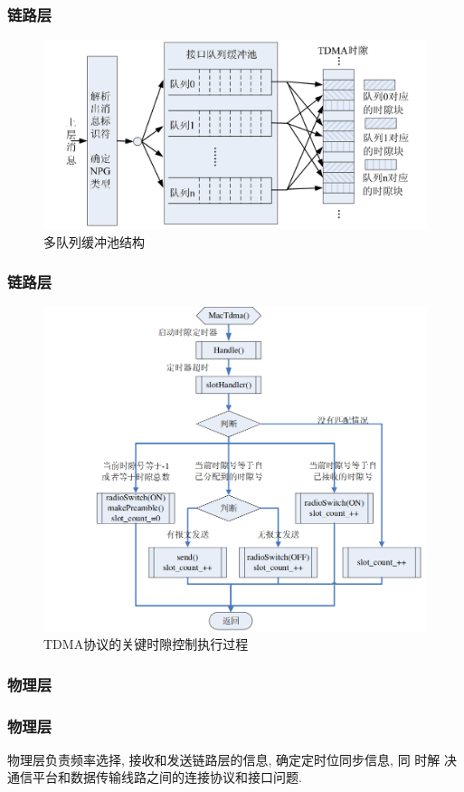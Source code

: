 \documentclass[10pt,mathserif]{beamer}%
\begin{document}
\begin{frame}[fragile]
	\frametitle{链路层}
	\setlength{\parindent}{2em}
	\begin{spacing}{1.5}
		\begin{figure}[htb]
			\centering
			\includegraphics[width=0.9\linewidth]{./images/fifo.png}
			\caption{多队列缓冲池结构}
			\label{Fig:fifo}
		\end{figure}
	\end{spacing}
\end{frame}

\begin{frame}[fragile]
	\frametitle{链路层}
	\setlength{\parindent}{2em}
	\begin{spacing}{1.5}
		\begin{figure}[htb]
			\centering
			\includegraphics[width=0.8\linewidth]{./images/tdma.png}
			\caption{TDMA协议的关键时隙控制执行过程}
			\label{Fig:mac}
		\end{figure}
	\end{spacing}
\end{frame}

\subsubsection{物理层}
\begin{frame}[fragile]
	\frametitle{物理层}
	\setlength{\parindent}{2em}
	\begin{spacing}{1.5}
		物理层负责频率选择, 接收和发送链路层的信息, 确定定时位同步信息, 同 时解
		决通信平台和数据传输线路之间的连接协议和接口问题.

	\end{spacing}
\end{frame}
\end{document}
